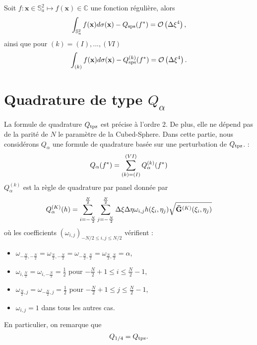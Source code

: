 \begin{theoreme}
Soit $f : \mathbf{x} \in \mathbb{S}_a^2 \mapsto f(\mathbf{x}) \in \mathbb{C}$ une fonction régulière, alors
\begin{equation}
\displaystyle\int_{\mathbb{S}_a^2} f(\mathbf{x}) d\sigma(\mathbf{x}) - Q_{\text{sps}}(f^*) = \mathcal{O} \left( \Delta \xi^4 \right),
\end{equation}
ainsi que pour $(k) = (I), ..., (VI)$
\begin{equation}
\displaystyle\int_{(k)} f(\mathbf{x}) d\sigma(\mathbf{x}) - Q_{\text{sps}}^{(k)}(f^*) = \mathcal{O} \left( \Delta \xi^4 \right).
\end{equation}
\end{theoreme}























\section{Quadrature de type $Q_{\alpha}$}

La formule de quadrature $Q_{\text{tpz}}$ est précise à l'ordre 2. De plus, elle ne dépend pas de la parité de $N$ le paramètre de la Cubed-Sphere. Dans cette partie, nous considérons $Q_{\alpha}$ une formule de quadrature basée sur une perturbation de $Q_{\text{tpz}}$. :
\begin{equation}
Q_{\alpha}(f^*)= \displaystyle\sum\limits_{(k)=(I)}^{(VI)} Q^{(k)}_{\alpha}(f^*)
\end{equation}
$Q^{(k)}_{\alpha}$ est la règle de quadrature par panel donnée par
\begin{equation}
Q_{\alpha}^{(K)}(h)=\displaystyle\sum\limits_{i = -\frac{N}{2}}^{\frac{N}{2}}\displaystyle\sum\limits_{j = -\frac{N}{2}}^{\frac{N}{2}} \Delta \xi \Delta \eta \omega_{i,j} h(\xi_i, \eta_j) \sqrt{\mathbf{\bar{G}}^{(K)}(\xi_i, \eta_j)}
\label{eq:alpha par panel}
\end{equation}
où les coefficients $(\omega_{i,j})_{-N/2 \leq i,j \leq N/2}$ vérifient :
\begin{itemize}
\item $\omega_{-\frac{N}{2},-\frac{N}{2}}=\omega_{\frac{N}{2},-\frac{N}{2}}=\omega_{-\frac{N}{2},\frac{N}{2}}=\omega_{\frac{N}{2},\frac{N}{2}}=\alpha$,
\item $\omega_{i,\frac{N}{2}}=\omega_{i,-\frac{N}{2}}=\frac{1}{2}$ pour $-\frac{N}{2}+1 \leq i \leq \frac{N}{2}-1$,
\item $\omega_{\frac{N}{2},j}=\omega_{-\frac{N}{2},j}=\frac{1}{2}$ pour $-\frac{N}{2}+1 \leq j \leq \frac{N}{2}-1$,
\item $\omega_{i,j}=1$ dans tous les autres cas.
\end{itemize}
En particulier, on remarque que
\begin{equation}
Q_{1/4} = Q_{\text{tpz}}.
\end{equation}

